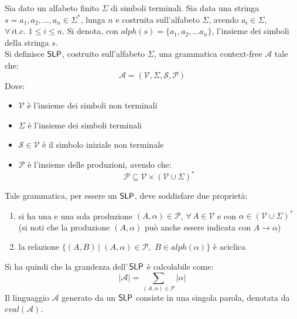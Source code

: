 \begin{definizione}
  Sia dato un alfabeto finito $\Sigma$ di simboli terminali. Sia data una
  stringa $s=a_1,a_2,\ldots, a_n\in\Sigma^{*}$, lunga $n$ e costruita
  sull'alfabeto $\Sigma$, avendo $a_i\in\Sigma$, $\forall\, i \mbox{
    t.c. }1\leq i\leq n$. Si denota, con $alph(s)=\{a_1,a_2,\ldots
  a_n\}$, l'insieme dei simboli della stringa $s$.\\
  Si definisce $\mbox{\rm {\sf SLP}}$, costruito sull'alfabeto $\Sigma$, una grammatica
  context-free $\mathcal{A}$ tale che: 
  \begin{equation}
    \label{eq:slpdef}
    \mathcal{A}=\left(\mathcal{V}, \Sigma, \mathcal{S}, \mathcal{P}\right)
  \end{equation}
  Dove:
  \begin{itemize}
    \item $\mathcal{V}$ è l'insieme dei simboli non terminali
    \item $\Sigma$ è l'insieme dei simboli terminali
    \item $\mathcal{S}\in \mathcal{V}$ è il simbolo iniziale non terminale
    \item $\mathcal{P}$ è l'insieme delle produzioni, avendo che:
    \begin{equation}
      \label{eq:slpprod}
      \mathcal{P}\subseteq \mathcal{V}\times\left(\mathcal{V}\cup
        \Sigma\right)^{*}
    \end{equation}
  \end{itemize}
  Tale grammatica, per essere un $\mbox{\rm {\sf SLP}}$, deve soddisfare due proprietà:
  \begin{enumerate}
    \item si ha una e una sola produzione $(A,\alpha)\in \mathcal{P}$,
    $\forall\, A\in \mathcal{V}$ e con $\alpha\in
    \left(\mathcal{V}\cup\Sigma\right)^{*}$ (si 
    noti che la produzione $(A,\alpha)$ può anche essere indicata con
    $A\to\alpha$) 
    \item la relazione $\{(A,B)\,|\,\,(A,\alpha)\in\mathcal{P},\,\,B\in
    alph(\alpha)\}$ è aciclica
  \end{enumerate}
  Si ha quindi che la grandezza dell'$\,\mbox{\rm {\sf SLP}}$ è calcolabile come:
  \begin{equation}
    \label{eq:slplen}
    |\mathcal{A}| = \sum_{(A,\alpha)\in\mathcal{P}}|\alpha|
  \end{equation}
  Il linguaggio $\mathcal{A}$ generato da un $\mbox{\rm {\sf SLP}}$ consiste in una singola
  parola, denotata da $eval(\mathcal{A})$. 
\end{definizione}
